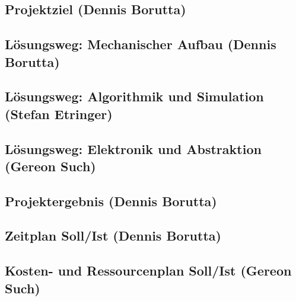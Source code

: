 \documentclass[
  a4paper,
  12pt,
  DIV=12,        %
  parskip=half,  %
  headings=small %
]{scrartcl}
\theoremstyle{definition}
\theoremstyle{definition}
\renewcommand{\cbstart}[1][]{}
\renewcommand{\cbend}{}
\renewcommand{\cbcolor}[1]{}
\begin{document}
\subsection{Projektziel (Dennis Borutta)}\label{projektziel}

\cbcolor{blue}
\cbstart

\cbend

\subsection{Lösungsweg: Mechanischer Aufbau (Dennis Borutta)}\label{lösungsweg-mechink}

\cbcolor{blue}
\cbstart

\cbend

\subsection{Lösungsweg: Algorithmik und Simulation (Stefan Etringer)}\label{lösungsweg-algorithmik}

\cbcolor{green}
\cbstart

\cbend

\subsection{Lösungsweg: Elektronik und Abstraktion (Gereon Such)}\label{lösungsweg-elektronik}

\cbcolor{red}
\cbstart

\cbend

\subsection{Projektergebnis (Dennis Borutta)}\label{projektergebnis}

\cbcolor{blue}
\cbstart

\cbend

\subsection{Zeitplan Soll/Ist (Dennis Borutta)}\label{zeitplan-sollist}

\cbcolor{blue}
\cbstart

\cbend

\subsection{Kosten- und Ressourcenplan Soll/Ist (Gereon Such)}\label{kosten-und-ressourcenplan-sollist}

\cbcolor{red}
\cbstart

\cbend
\end{document}
